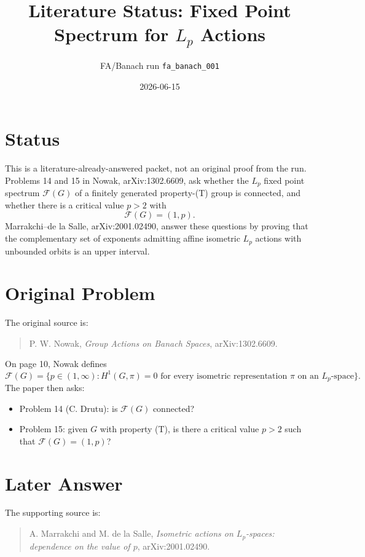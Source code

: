 \documentclass[11pt]{article}
\title{Literature Status: Fixed Point Spectrum for \texorpdfstring{$L_p$}{Lp} Actions}
\author{FA/Banach run \texttt{fa\_banach\_001}}
\date{2026-06-15}
\begin{document}
\maketitle

\section*{Status}

This is a literature-already-answered packet, not an original proof from the
run.  Problems 14 and 15 in Nowak, arXiv:1302.6609, ask whether the
$L_p$ fixed point spectrum $\mathcal F(G)$ of a finitely generated
property-(T) group is connected, and whether there is a critical value
$p>2$ with
\[
  \mathcal F(G)=(1,p).
\]
Marrakchi--de la Salle, arXiv:2001.02490, answer these questions by proving
that the complementary set of exponents admitting affine isometric
$L_p$ actions with unbounded orbits is an upper interval.

\section*{Original Problem}

The original source is:

\begin{quote}
P. W. Nowak, \emph{Group Actions on Banach Spaces}, arXiv:1302.6609.
\end{quote}

On page 10, Nowak defines
\[
\mathcal F(G)=\{p\in(1,\infty): H^1(G,\pi)=0
\text{ for every isometric representation }\pi\text{ on an }L_p\text{-space}\}.
\]
The paper then asks:

\begin{itemize}
\item Problem 14 (C. Drutu): is $\mathcal F(G)$ connected?
\item Problem 15: given $G$ with property (T), is there a critical value
      $p>2$ such that $\mathcal F(G)=(1,p)$?
\end{itemize}

\section*{Later Answer}

The supporting source is:

\begin{quote}
A. Marrakchi and M. de la Salle,
\emph{Isometric actions on $L_p$-spaces: dependence on the value of $p$},
arXiv:2001.02490.
\end{quote}
\end{document}
